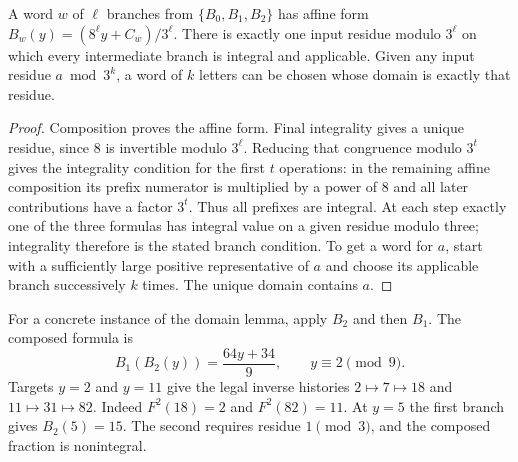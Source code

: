 \begin{lemma}\label{lem:inverse-domains}
A word $w$ of $\ell$ branches from $\{B_0,B_1,B_2\}$ has affine form
$B_w(y)=(8^\ell y+C_w)/3^\ell$. There is exactly one input residue modulo
$3^\ell$ on which every intermediate branch is integral and applicable.
Given any input residue $a\bmod3^k$, a word of $k$ letters can be chosen
whose domain is exactly that residue.
\end{lemma}
\begin{proof}
Composition proves the affine form. Final integrality gives a unique
residue, since 8 is invertible modulo $3^\ell$. Reducing that congruence
modulo $3^t$ gives the integrality condition for the first $t$ operations:
in the remaining affine composition its prefix numerator is multiplied
by a power of 8 and all later contributions have a factor $3^t$.
Thus all prefixes are integral. At each step exactly one of the three
formulas has integral value on a given residue modulo three; integrality
therefore is the stated branch condition. To get a word for $a$, start
with a sufficiently large positive representative of $a$ and choose its
applicable branch successively $k$ times. The unique domain contains $a$.
\end{proof}

For a concrete instance of the domain lemma, apply $B_2$ and then $B_1$.
The composed formula is
\[
 B_1(B_2(y))=\frac{64y+34}{9},\qquad y\equiv2\pmod9.
\]
Targets $y=2$ and $y=11$ give the legal inverse histories
$2\mapsto7\mapsto18$ and $11\mapsto31\mapsto82$.
Indeed $F^2(18)=2$ and $F^2(82)=11$. At $y=5$ the first branch gives
$B_2(5)=15$. The second requires residue $1\pmod3$, and the composed fraction
is nonintegral.

